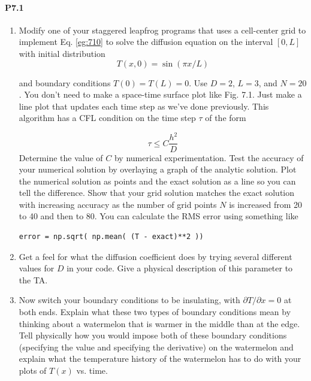 \documentclass{book}
\theoremstyle{plain}
\theoremstyle{definition}
\numberwithin{exm}{chapter}
\theoremstyle{remark}
\theoremstyle{summary}
\theoremstyle{overview}
\begin{document}
\paragraph*{P7.1}
\begin{enumerate}[label=(\alph*)]
\item 
Modify one of your staggered leapfrog programs that uses a cell-center
grid to implement Eq. \eqref{eg:710} to solve the diffusion equation on the
interval $[0,L]$ with initial distribution
\begin{equation}\label{eq:711}
T(x, 0)=\sin (\pi x / L)
\end{equation}

and boundary conditions $ T(0) = T (L) = 0$. Use $D = 2$, $L = 3$, and $N =
20$. You don\rq t need to make a space-time surface plot like Fig. 7.1. Just
make a line plot that updates each time step as we\rq ve done previously.
This algorithm has a CFL condition on the time step $\tau$ of the form

\begin{equation}\label{eq:712}
\tau \leq C \frac{h^{2}}{D}
\end{equation}
Determine the value of $C$ by numerical experimentation.
Test the accuracy of your numerical solution by overlaying a graph of
the analytic solution. Plot the numerical solution as points and the
exact solution as a line so you can tell the difference. Show that your
grid solution matches the exact solution with increasing accuracy as
the number of grid points $N$ is increased from 20 to 40 and then to 80.
You can calculate the RMS error using something like
\begin{lstlisting}
error = np.sqrt( np.mean( (T - exact)**2 ))
\end{lstlisting}

\item Get a feel for what the diffusion coefficient does by trying several
different values for $D$ in your code. Give a physical description of this
parameter to the TA.
\item Now switch your boundary conditions to be insulating, with $\partial T / \partial x=
0$ at both ends. Explain what these two types of boundary conditions
mean by thinking about a watermelon that is warmer in the middle
than at the edge. Tell physically how you would impose both of these
boundary conditions (specifying the value and specifying the derivative) on the watermelon and explain what the temperature history of
the watermelon has to do with your plots of $T(x)$ vs. time.
\end{enumerate}
\end{document}

